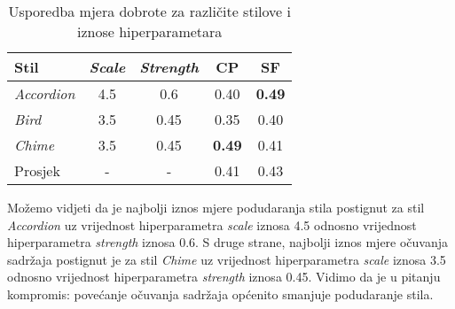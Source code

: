 \begin{table}[H]
    \centering
    \caption{Usporedba mjera dobrote za različite stilove i iznose hiperparametara}
    \label{table:usporedne_mjere}
    \begin{tabular}{ |l|c|c|c|c| }
        \hline
        Stil & \textit{Scale} & \textit{Strength} & CP & SF \\
        \hline 
        \textit{Accordion} & 4.5 & 0.6 & 0.40 & \textbf{0.49} \\
        \textit{Bird} & 3.5 & 0.45 & 0.35 & 0.40 \\
        \textit{Chime} & 3.5 & 0.45 & \textbf{0.49} & 0.41 \\
        \hline
        Prosjek & - & - & 0.41 & 0.43 \\
        \hline
    \end{tabular}
\end{table}

Možemo vidjeti da je najbolji iznos mjere podudaranja stila postignut za stil \textit{Accordion} uz vrijednost hiperparametra \textit{scale} iznosa 4.5 odnosno vrijednost hiperparametra \textit{strength} iznosa 0.6. S druge strane, najbolji iznos mjere očuvanja sadržaja postignut je za stil \textit{Chime} uz vrijednost hiperparametra \textit{scale} iznosa 3.5 odnosno vrijednost hiperparametra \textit{strength} iznosa 0.45. Vidimo da je u pitanju kompromis: povećanje očuvanja sadržaja općenito smanjuje podudaranje stila.

